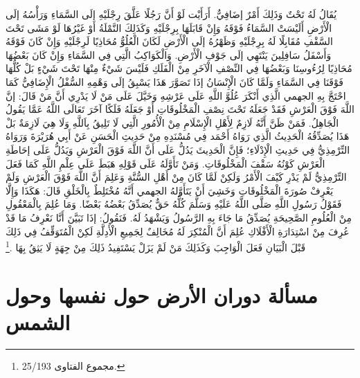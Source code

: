 يُقَالُ لَهُ تَحْتٌ وَذَلِكَ أَمْرٌ إضَافِيٌّ. أَرَأَيْت لَوْ أَنَّ رَجُلًا عَلَّقَ رِجْلَيْهِ إلَى السَّمَاءِ وَرَأْسُهُ إلَى الْأَرْضِ أَلَيْسَتْ السَّمَاءُ فَوْقَهُ وَإِنْ قَابَلَهَا بِرِجْلَيْهِ وَكَذَلِكَ النَّمْلَةُ أَوْ غَيْرُهَا لَوْ مَشَى تَحْتَ السَّقْفِ مُقَابِلًا لَهُ بِرِجْلَيْهِ وَظَهْرُهُ إلَى الْأَرْضِ لَكَانَ الْعُلُوُّ مُحَاذِيًا لَرِجْلَيْهِ وَإِنْ كَانَ فَوْقَهُ وَأَسْفَلُ سَافِلِينَ يَنْتَهِي إلَى جَوْفِ الْأَرْضِ. وَالْكَوَاكِبُ الَّتِي فِي السَّمَاءِ وَإِنْ كَانَ بَعْضُهَا مُحَاذِيًا لِرُءُوسِنَا وَبَعْضُهَا فِي النِّصْفِ الْآخَرِ مِنْ الْفَلَكِ فَلَيْسَ شَيْءٌ مِنْهَا تَحْتَ شَيْءٍ بَلْ كُلُّهَا فَوْقَنَا فِي السَّمَاءِ وَلَمَّا كَانَ الْإِنْسَانُ إذَا تَصَوَّرَ هَذَا يَسْبِقُ إلَى وَهْمِهِ السُّفْلُ الْإِضَافِيُّ كَمَا احْتَجَّ بِهِ الجهمي الَّذِي أَنْكَرَ عُلُوَّ اللَّهِ عَلَى عَرْشِهِ وَخَيَّلَ عَلَى مَنْ لَا يَدْرِي أَنَّ مَنْ قَالَ: إنَّ اللَّهَ فَوْقَ الْعَرْشِ فَقَدْ جَعَلَهُ تَحْتَ نِصْفِ الْمَخْلُوقَاتِ أَوْ جَعَلَهُ فَلَكًا آخَرَ تَعَالَى اللَّهُ عَمَّا يَقُولُ الْجَاهِلُ. فَمَنْ ظَنَّ أَنَّهُ لَازِمٌ لِأَهْلِ الْإِسْلَامِ مِنْ الْأُمُورِ الَّتِي لَا تَلِيقُ بِاَللَّهِ وَلَا هِيَ لَازِمَةٌ بَلْ هَذَا يُصَدِّقُهُ الْحَدِيثُ الَّذِي رَوَاهُ أَحْمَد فِي مُسْنَدِهِ مِنْ حَدِيثِ الْحَسَنِ عَنْ أَبِي هُرَيْرَةَ وَرَوَاهُ التِّرْمِذِيُّ فِي حَدِيثِ الْإِدْلَاءِ؛ فَإِنَّ الْحَدِيثَ يَدُلُّ عَلَى أَنَّ اللَّهَ فَوْقَ الْعَرْشِ وَيَدُلُّ عَلَى إحَاطَةِ الْعَرْشِ كَوْنُهُ سَقْفَ الْمَخْلُوقَاتِ. وَمَنْ تَأَوَّلَهُ عَلَى قَوْلِهِ هَبَطَ عَلَى عِلْمِ اللَّهِ كَمَا فَعَلَ التِّرْمِذِيُّ لَمْ يَدْرِ كَيْفَ الْأَمْرُ وَلَكِنْ لَمَّا كَانَ مِنْ أَهْلِ السُّنَّةِ وَعَلِمَ أَنَّ اللَّهَ فَوْقَ الْعَرْشِ وَلَمْ يَعْرِفْ صُورَةَ الْمَخْلُوقَاتِ وَخَشِيَ أَنْ يَتَأَوَّلهُ الجهمي أَنَّهُ مُخْتَلِطٌ بِالْخَلْقِ قَالَ: هَكَذَا وَإِلَّا فَقَوْلُ رَسُولِ اللَّهِ صَلَّى اللَّهُ عَلَيْهِ وَسَلَّمَ كُلُّهُ حَقٌّ يُصَدِّقُ بَعْضُهُ بَعْضًا. وَمَا عُلِمَ بِالْمَعْقُولِ مِنْ الْعُلُومِ الصَّحِيحَةِ يُصَدِّقُ مَا جَاءَ بِهِ الرَّسُولُ وَيَشْهَدُ لَهُ. فَنَقُولُ: إذَا تَبَيَّنَ أَنَّا نَعْرِفُ مَا قَدْ عُرِفَ مِنْ اسْتِدَارَةِ الْأَفْلَاكِ عُلِمَ أَنَّ الْمُنْكِرَ لَهُ مُخَالِفٌ لِجَمِيعِ الْأَدِلَّةِ لَكِنْ الْمُتَوَقِّفُ فِي ذَلِكَ قَبْلَ الْبَيَانِ فَعَلَ الْوَاجِبَ وَكَذَلِكَ مَنْ لَمْ يَزَلْ يَسْتَفِيدُ ذَلِكَ مِنْ جِهَةٍ لَا يَثِقُ بِهَا \href{https://shamela.ws/book/7289/12641#p1}{\faExternalLink} \cite{ibnTaimia_Majmoo}.\footnote{مجموع الفتاوى 25/193.}

\section{مسألة دوران الأرض حول نفسها وحول الشمس}
\label{sec:app_solar_system_albani}


